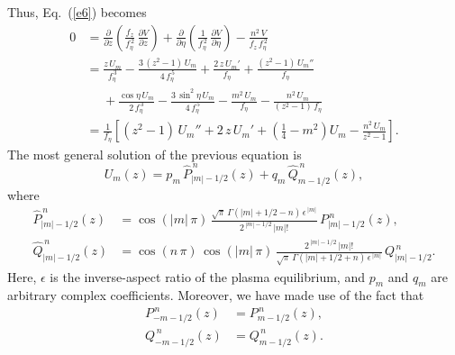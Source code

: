 \documentclass[12pt,prb,aps,notitlepage]{revtex4-1}
\begin{document}
Thus, Eq.~(\ref{e6}) becomes 
\begin{align}
0&=\frac{\partial}{\partial z}\!\left(\frac{f_z}{f_\eta^{\,2}}\,\frac{\partial V}{\partial z}\right)+ \frac{\partial}{\partial \eta}\!\left(\frac{1}{f_\eta^{\,2}}\,\frac{\partial V}{\partial \eta}\right)
-\frac{n^2\,V}{f_z\,f_\eta^{\,2}}\nonumber\\[0.5ex]&
= \frac{z\,U_m}{f_\eta^{\,3}} -\frac{3\,(z^2-1)\,U_m}{4\,f_\eta^{\,5}}
+\frac{2\,z\,U_m'}{f_\eta}
+\frac{(z^2-1)\,U_m''}{f_\eta}\nonumber\\[0.5ex]
&\phantom{=}+\frac{\cos\eta\,U_m}{2\,f_\eta^{\,3}}- \frac{3\,\sin^2\eta\,U_m}{4\,f_\eta^{\,5}} - \frac{m^2\,U_m}{f_\eta} -\frac{n^2\,U_m}{(z^2-1)\,f_\eta}\nonumber\\[0.5ex]
&=\frac{1}{f_\eta}\left[(z^2-1)\,U_m'' + 2\,z\,U_m' + \left(\frac{1}{4}-m^2\right)U_m - \frac{n^2\,U_m}{z^2-1}\right].
\end{align}
The most general solution of the previous equation is
\begin{equation}\label{e20}
U_m(z) = p_m\,\hat{P}_{|m|-1/2}^{\,n}(z)+q_m\,\hat{Q}_{m-1/2}^{\,n}(z),
\end{equation}
where
\begin{align}\label{e21}
\hat{P}_{|m|-1/2}^{\,n}(z) &= \cos(|m|\,\pi)\,\frac{\sqrt{\pi}\,\Gamma(|m|+1/2-n)\,\epsilon^{\,|m|}}{2^{\,|m|-1/2}\,|m|!}\,P_{|m|-1/2}^{\,n}(z),\\[0.5ex]
\hat{Q}_{|m|-1/2}^{\,n}(z)&= \cos(n\,\pi)\,\cos(|m|\,\pi)\,\frac{2^{\,|m|-1/2}\,|m|!}{\sqrt{\pi}\,\Gamma(|m|+1/2+n)\,\epsilon^{\,|m|}}\,Q_{|m|-1/2}^{\,n}.\label{e22}
\end{align}
Here,  $\epsilon$ is the inverse-aspect ratio of the plasma equilibrium, and  $p_m$ and $q_m$ are arbitrary complex coefficients. 
Moreover, we have made use of the fact that 
\begin{align}
P_{-m-1/2}^{\,n}(z) &= P_{m-1/2}^{\,n}(z),\\[0.5ex]
Q_{-m-1/2}^{\,n}(z) &= Q_{m-1/2}^{\,n}(z).
\end{align}
\end{document}
